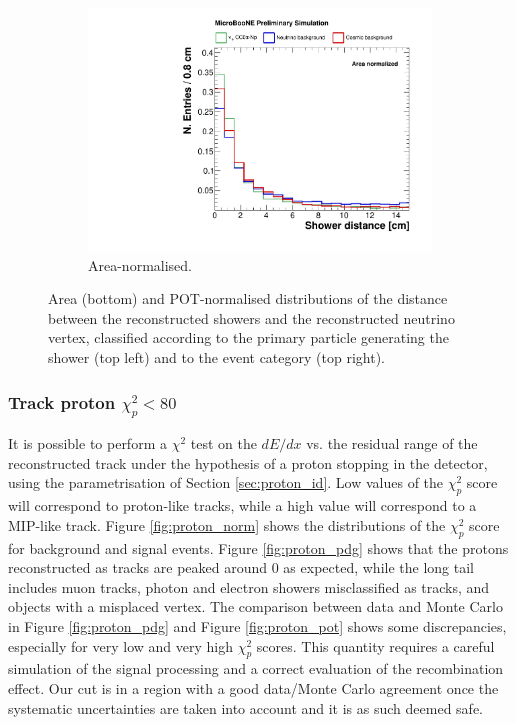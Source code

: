 \begin{figure}[htbp]
\begin{subfigure}{0.49\textwidth}
    \includegraphics[width=\linewidth]{figures/h_shower_distance_norm.pdf}
    \caption{Area-normalised.} \label{fig:showerd_norm}
  \end{subfigure}
  \caption{Area (bottom) and POT-normalised distributions of the distance between the reconstructed showers and the reconstructed neutrino vertex, classified according to the primary particle generating the shower (top left) and to the event category (top right).}
\end{figure}

\subsubsection*{Track proton $\chi_{p}^2 < 80$}
It is possible to perform a $\chi^2$ test on the $dE/dx$ vs. the residual range of the reconstructed track under the hypothesis of a proton stopping in the detector, using the parametrisation of Section \ref{sec:proton_id}. Low values of the $\chi_{p}^2$ score will correspond to proton-like tracks, while a high value will correspond to a MIP-like track. Figure \ref{fig:proton_norm} shows the distributions of the $\chi_{p}^2$ score for background and signal events. Figure \ref{fig:proton_pdg} shows that the protons reconstructed as tracks are peaked around 0 as expected, while the long tail includes muon tracks, photon and electron showers misclassified as tracks, and objects with a misplaced vertex. The comparison between data and Monte Carlo in Figure \ref{fig:proton_pdg} and Figure \ref{fig:proton_pot} shows some discrepancies, especially for very low and very high $\chi_{p}^2$ scores. This quantity requires a careful simulation of the signal processing and a correct evaluation of the recombination effect. Our cut is in a region with a good data/Monte Carlo agreement once the systematic uncertainties are taken into account and it is as such deemed safe.

